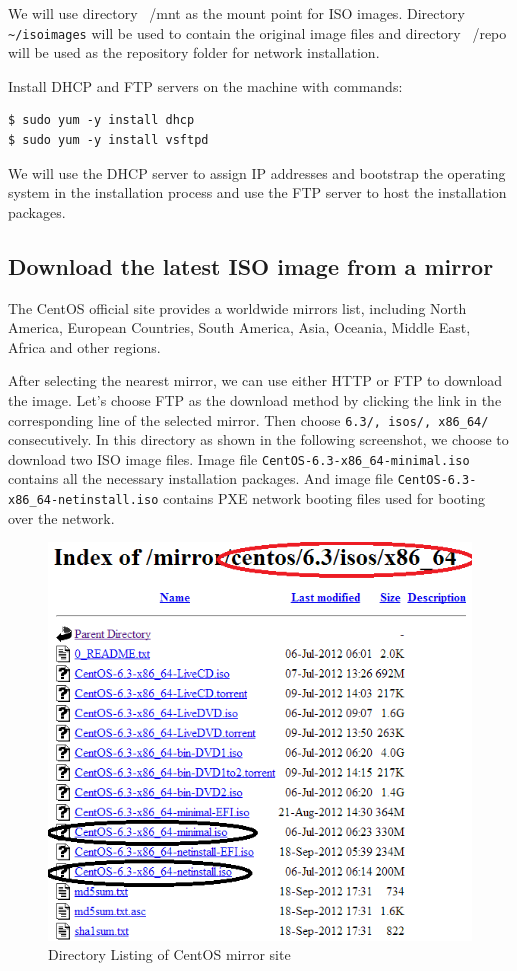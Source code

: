 We will use directory ~/mnt as the mount point for ISO images. Directory \verb|~/isoimages| will be used to contain the original image files and directory ~/repo will be used as the repository folder for network installation.

Install DHCP and FTP servers on the machine with commands: 
\lstset{style=bashstyle}
\begin{lstlisting}
$ sudo yum -y install dhcp
$ sudo yum -y install vsftpd
\end{lstlisting}

We will use the DHCP server to assign IP addresses and bootstrap the operating system in the installation process and use the FTP server to host the installation packages.
\subsection*{Download the latest ISO image from a mirror}
The CentOS official site provides a worldwide mirrors list, including North America, European Countries, South America, Asia, Oceania, Middle East, Africa and other regions.

After selecting the nearest mirror, we can use either HTTP or FTP to download the image. Let's choose FTP as the download method by clicking the link in the corresponding line of the selected mirror. Then choose \verb|6.3/, isos/, x86_64/| consecutively. In this directory as shown in the following screenshot, we choose to download two ISO image files. Image file \verb|CentOS-6.3-x86_64-minimal.iso| contains all the necessary installation packages. And image file \verb|CentOS-6.3-x86_64-netinstall.iso| contains PXE network booting files used for booting over the network.

\begin{figure}[h]
  \centering
  \includegraphics[width=.6\textwidth]{figs/5163os_02_02.png}
  \caption{Directory Listing of CentOS mirror site}\label{fig:centos.mirror}
\end{figure} 

